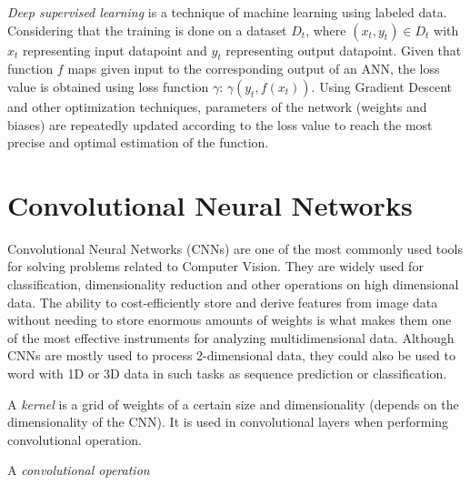 \begin{definition}
  \textit{Deep supervised learning} \autocite{alzubaidi2021review} \autocite{cun2015deeplearning} \autocite{oshea2015introductionconvolutionalneuralnetworks} is a technique of machine learning using labeled data. Considering that the training is done on a dataset \(D_t\), where \((x_t, y_t) \in D_t\) with \(x_t\) representing input datapoint and \(y_t\) representing output datapoint. Given that function \(f\) maps given input to the corresponding output of an ANN, the loss value is obtained using loss function \(\gamma\):  \(\gamma(y_t, f(x_t))\). Using Gradient Descent and other optimization techniques, parameters of the network (weights and biases) are repeatedly updated according to the loss value to reach the most precise and optimal estimation of the function.
\end{definition}

\section{Convolutional Neural Networks}

Convolutional Neural Networks (CNNs) are one of the most commonly used tools for solving problems related to Computer Vision. They are widely used for classification, dimensionality reduction and other operations on high dimensional data. The ability to cost-efficiently store and derive features from image data without needing to store enormous amounts of weights is what makes them one of the most effective instruments for analyzing multidimensional data. Although CNNs are mostly used to process 2-dimensional data, they could also be used to word with 1D or 3D data in such tasks as sequence prediction or classification.

\begin{definition}
  A \textit{kernel} \autocite{alzubaidi2021review} is a grid of weights of a certain size and dimensionality (depends on the dimensionality of the CNN). It is used in convolutional layers when performing convolutional operation.
\end{definition}

\begin{definition}
  A \textit{convolutional operation} \autocite{alzubaidi2021review}
\end{definition}

